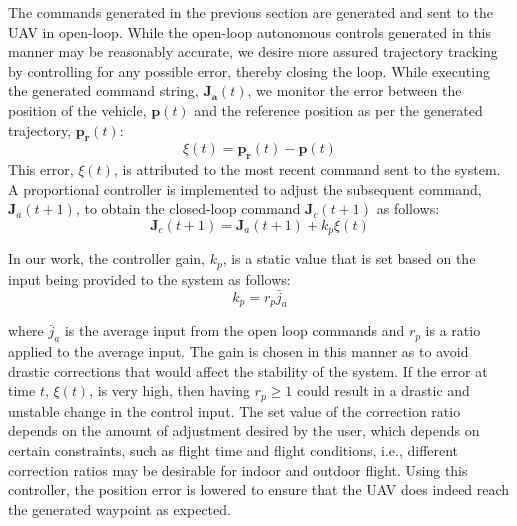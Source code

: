\documentclass[letterpaper, 10 pt, conference]{ieeeconf}  %
\newcommand\NB[1]{$\spadesuit$\footnote{NB: #1}}
\begin{document}
The commands generated in the previous section are generated and sent to the UAV in open-loop. While the open-loop autonomous controls generated in this manner may be reasonably accurate, we desire more assured trajectory tracking by controlling for any possible error, thereby closing the loop. While executing the generated command string, $\bm{J_a}(t)$, we monitor the error between the position of the vehicle, $\bm{p}(t)$ and the reference position as per the generated trajectory, $\bm{p_r}(t)$:
\begin{equation}
    \xi(t) = \bm{p_r}(t)-\bm{p}(t)
\end{equation}
This error, $\xi(t)$, is attributed to the most recent command sent to the system. A proportional controller is implemented to adjust the subsequent command, $\bm{J}_a(t+1)$, to obtain the closed-loop command $\bm{J}_c(t+1)$ as follows:
\begin{equation}
    \bm{J}_c(t+1) = \bm{J}_a(t+1) + k_p\xi(t)
\end{equation}

In our work, the controller gain, $k_p$, is a static value that is set based on the input being provided to the system as follows:
\begin{equation} \label{eq:ctrls}
    k_p = r_p\bar{j}_a
\end{equation}

where $\bar{j}_a$ is the average input from the open loop commands and $r_p$ is a ratio applied to the average input. The gain is chosen in this manner as to avoid drastic corrections that would affect the stability of the system. If the error at time $t$, $\xi(t)$, is very high, then having $r_p \geq 1$ could result in a drastic and unstable change in the control input. The set value of the correction ratio depends on the amount of adjustment desired by the user, which depends on certain constraints, such as flight time and flight conditions, i.e., different correction ratios may be desirable for indoor and outdoor flight. Using this controller, the position error is lowered to ensure that the UAV does indeed reach the generated waypoint as expected.  %

\end{document}
